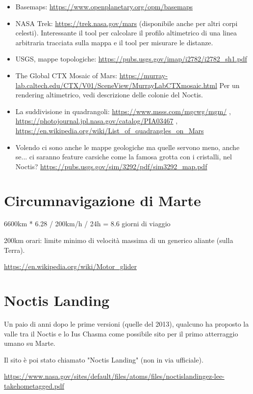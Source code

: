 \documentclass[a4paper,10pt,openany,oneside]{memoir}
\begin{document}
\begin{itemize}
  \item Basemaps: \url{https://www.openplanetary.org/opm/basemaps}
  \item NASA Trek: \url{https://trek.nasa.gov/mars} (disponibile anche per altri corpi celesti). Interessante il tool per calcolare il profilo altimetrico di una linea arbitraria tracciata sulla mappa e il tool per misurare le distanze.
  \item USGS, mappe topologiche: \url{https://pubs.usgs.gov/imap/i2782/i2782_sh1.pdf}
  \item The Global CTX Mosaic of Mars: \url{https://murray-lab.caltech.edu/CTX/V01/SceneView/MurrayLabCTXmosaic.html} Per un rendering altimetrico, vedi descrizione delle colonie del Noctis.
  \item La suddivisione in quadrangoli: \url{https://www.msss.com/mgcwg/mgm/} , \url{https://photojournal.jpl.nasa.gov/catalog/PIA03467} , \url{https://en.wikipedia.org/wiki/List_of_quadrangles_on_Mars} 
  \item Volendo ci sono anche le mappe geologiche ma quelle servono meno, anche se... ci saranno feature carsiche come la famosa grotta con i cristalli, nel Noctis? \url{https://pubs.usgs.gov/sim/3292/pdf/sim3292_map.pdf} 
\end{itemize}


\section{Circumnavigazione di Marte}

6600km * 6.28 / 200km/h / 24h = 8.6 giorni di viaggio

200km orari: limite minimo di velocità massima di un generico aliante (sulla Terra).

\url{https://en.wikipedia.org/wiki/Motor_glider}


\section{Noctis Landing}

Un paio di anni dopo le prime versioni (quelle del 2013), qualcuno ha proposto la valle tra il Noctis e lo Ius Chasma come possibile sito per il primo atterraggio umano su Marte.

Il sito è poi stato chiamato "Noctis Landing" (non in via ufficiale).

\url{https://www.nasa.gov/sites/default/files/atoms/files/noctislandingez-lee-takehometagged.pdf}
\end{document}
